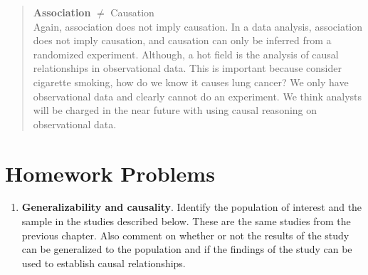 \documentclass[
  letterpaper,
  DIV=11,
  numbers=noendperiod]{scrreprt}
\providecommand{\tightlist}{%
  \setlength{\itemsep}{0pt}\setlength{\parskip}{0pt}}\usepackage{longtable,booktabs,array}
\begin{document}
\begin{quote}
\textbf{Association} \(\neq\) Causation\\
Again, association does not imply causation. In a data analysis,
association does not imply causation, and causation can only be inferred
from a randomized experiment. Although, a hot field is the analysis of
causal relationships in observational data. This is important because
consider cigarette smoking, how do we know it causes lung cancer? We
only have observational data and clearly cannot do an experiment. We
think analysts will be charged in the near future with using causal
reasoning on observational data.
\end{quote}

\section{Homework Problems}\label{homework-problems-2}

\begin{enumerate}
\def\labelenumi{\arabic{enumi}.}
\tightlist
\item
  \textbf{Generalizability and causality}. Identify the population of
  interest and the sample in the studies described below. These are the
  same studies from the previous chapter. Also comment on whether or not
  the results of the study can be generalized to the population and if
  the findings of the study can be used to establish causal
  relationships.
\end{enumerate}
\end{document}
